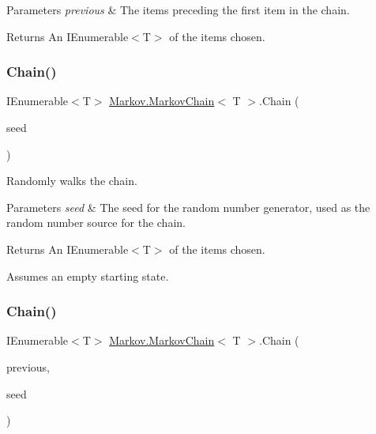 \begin{DoxyParams}{Parameters}
{\em previous} & The items preceding the first item in the chain.\\
\hline
\end{DoxyParams}
\begin{DoxyReturn}{Returns}
An I\+Enumerable$<$\+T$>$ of the items chosen.
\end{DoxyReturn}
\mbox{\label{class_markov_1_1_markov_chain_a4abb9314bca458994acd685a9357e1a0}} 
\subsubsection{\texorpdfstring{Chain()}{Chain()}\hspace{0.1cm}{\footnotesize\ttfamily [3/6]}}
{\footnotesize\ttfamily I\+Enumerable$<$T$>$ \mbox{\hyperlink{class_markov_1_1_markov_chain}{Markov.\+Markov\+Chain}}$<$ T $>$.Chain (\begin{DoxyParamCaption}\item[{int}]{seed }\end{DoxyParamCaption})}



Randomly walks the chain. 


\begin{DoxyParams}{Parameters}
{\em seed} & The seed for the random number generator, used as the random number source for the chain.\\
\hline
\end{DoxyParams}
\begin{DoxyReturn}{Returns}
An I\+Enumerable$<$\+T$>$ of the items chosen.
\end{DoxyReturn}


Assumes an empty starting state.\mbox{\label{class_markov_1_1_markov_chain_a325079fed5b93f2207814fa44a8108da}} 
\subsubsection{\texorpdfstring{Chain()}{Chain()}\hspace{0.1cm}{\footnotesize\ttfamily [4/6]}}
{\footnotesize\ttfamily I\+Enumerable$<$T$>$ \mbox{\hyperlink{class_markov_1_1_markov_chain}{Markov.\+Markov\+Chain}}$<$ T $>$.Chain (\begin{DoxyParamCaption}\item[{I\+Enumerable$<$ T $>$}]{previous,  }\item[{int}]{seed }\end{DoxyParamCaption})}




